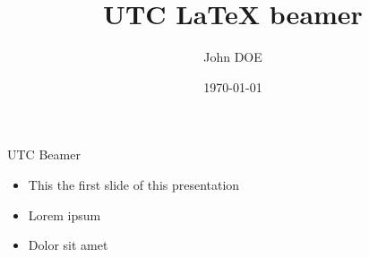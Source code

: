 \documentclass[aspectratio=169]{beamer}
\title{UTC LaTeX beamer}
\author{John DOE}
\institute{UTC/GI/HDS}
\date{\today}
\begin{document}
\frame[plain]{\utctitlepage}

\begin{frame}{UTC Beamer}
    \begin{itemize}

        \item This the first slide of this presentation
        \item Lorem ipsum
        \item Dolor sit amet

    \end{itemize}
\end{frame}

\end{document}
